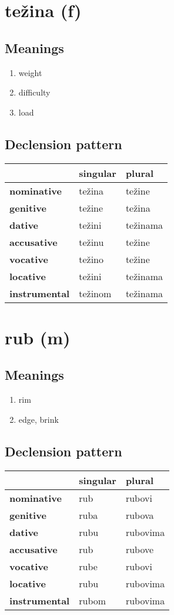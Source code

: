 \filbreak
\section{težina (f)}
\subsection*{Meanings}
\begin{enumerate}
\item weight
\item difficulty
\item load
\end{enumerate}
\subsection*{Declension pattern}
\begin{tabularx}{\linewidth}{Xll}
\toprule
{} & singular &    plural \\
\midrule
\textbf{nominative  } &   težina &    težine \\
\textbf{genitive    } &   težine &    težina \\
\textbf{dative      } &   težini &  težinama \\
\textbf{accusative  } &   težinu &    težine \\
\textbf{vocative    } &   težino &    težine \\
\textbf{locative    } &   težini &  težinama \\
\textbf{instrumental} &  težinom &  težinama \\
\bottomrule
\end{tabularx}

\filbreak
\section{rub (m)}
\subsection*{Meanings}
\begin{enumerate}
\item rim
\item edge, brink
\end{enumerate}
\subsection*{Declension pattern}
\begin{tabularx}{\linewidth}{Xll}
\toprule
{} & singular &    plural \\
\midrule
\textbf{nominative  } &      rub &    rubovi \\
\textbf{genitive    } &     ruba &    rubova \\
\textbf{dative      } &     rubu &  rubovima \\
\textbf{accusative  } &      rub &    rubove \\
\textbf{vocative    } &     rube &    rubovi \\
\textbf{locative    } &     rubu &  rubovima \\
\textbf{instrumental} &    rubom &  rubovima \\
\bottomrule
\end{tabularx}

